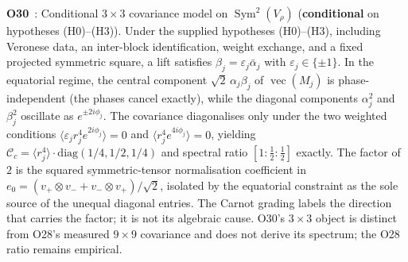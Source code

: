 \documentclass[11pt,a4paper]{article}
\newcommand{\scond}{\textcolor{ccond}{\textbf{conditional}}}
\begin{document}
    \textbf{O30}~\cite{Beau2026a34}: Conditional $3\times3$ covariance model on
    $\operatorname{Sym}^2(V_\rho)$ (\scond{} on hypotheses (H0)--(H3)).
    Under the supplied hypotheses (H0)--(H3), including Veronese data, an inter-block
    identification, weight exchange, and a fixed projected symmetric square, a lift satisfies
    $\beta_j=\varepsilon_j\bar\alpha_j$ with $\varepsilon_j\in\{\pm1\}$.
    In the equatorial regime, the central component $\sqrt{2}\,\alpha_j\beta_j$ of
    $\operatorname{vec}(M_j)$ is phase-independent (the phases cancel exactly), while the
    diagonal components $\alpha_j^2$ and $\beta_j^2$ oscillate as $e^{\pm 2i\phi_j}$.
    The covariance diagonalises only under the two weighted conditions
    $\langle\varepsilon_j r_j^4e^{2i\phi_j}\rangle=0$ and
    $\langle r_j^4e^{4i\phi_j}\rangle=0$, yielding
    $\mathcal{C}_c = \langle r_j^4\rangle \cdot \mathrm{diag}(1/4, 1/2, 1/4)$
    and spectral ratio $[1:\tfrac{1}{2}:\tfrac{1}{2}]$ exactly.
    The factor of~$2$ is the squared symmetric-tensor normalisation
    coefficient in $e_0 = (v_+\!\otimes v_- + v_-\!\otimes v_+)/\sqrt{2}$, isolated by the
    equatorial constraint as the sole source of the unequal diagonal entries. The Carnot grading
    labels the direction that carries the factor; it is not its algebraic cause.
    O30's $3\times3$ object is distinct from O28's measured $9\times9$ covariance and does not
    derive its spectrum; the O28 ratio remains empirical.
\end{document}
